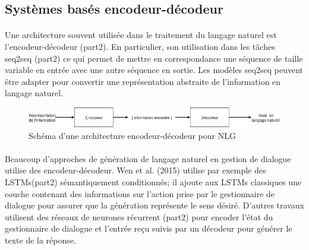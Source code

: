 \subsection{Systèmes basés encodeur-décodeur}
\paragraph{}
Une architecture souvent utilisée dans le traitement du langage naturel est l’encodeur-décodeur (part2). En particulier, son utilisation dans les tâches seq2seq (part2) ce qui permet de mettre en correspondance une séquence de taille variable en entrée avec une autre séquence en sortie. Les modèles seq2seq peuvent être adapter pour convertir une représentation abstraite de l’information en langage naturel\cite{Ferreira2017}.\newline
\begin{figure}[H]
	\centering
	\includegraphics[width=.95\linewidth]{images/NLG/Encoder.png} 
	\caption{Schéma d'une architecture encodeur-décodeur pour NLG} 
\end{figure}
\paragraph{}
Beaucoup d’approches de génération de langage naturel en gestion de dialogue utilise des encodeur-décodeur. Wen et al. (2015)\cite{Wen2015} utilise par exemple des LSTMs(part2) sémantiquement conditionnés; il ajoute aux LSTMs classiques une couche contenant des informations sur l’action prise par le gestionnaire de dialogue pour assurer que la génération représente le sens désiré. D’autres travaux utilisent des réseaux de neurones récurrent (part2) pour encoder l’état du gestionnaire de dialogue et l’entrée reçu suivis par un décodeur pour générer le texte de la réponse\cite{Sordoni2015}\cite{Serban2016}\cite{Goyal2016}.
	